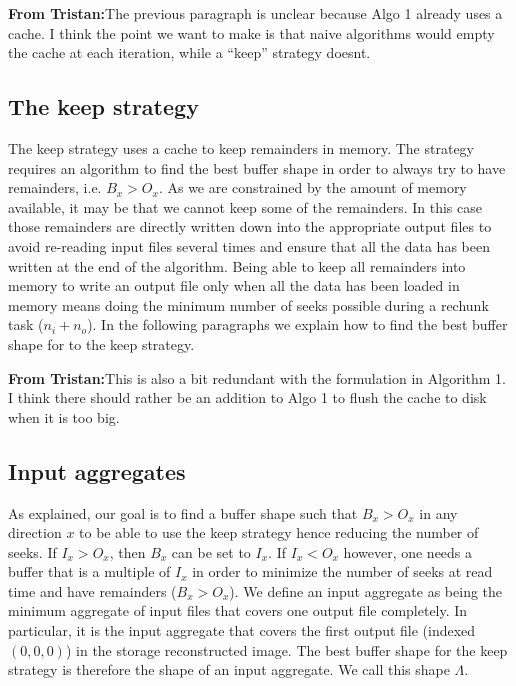 \documentclass[conference]{IEEEtran}
\newcommand{\tristan}[1]{\color{orange}\textbf{From Tristan:}#1\color{black}}
\begin{document}
\tristan{The previous paragraph is unclear because Algo 1 already uses a cache. I think the point we want to make is that
naive algorithms would empty the cache at each iteration, while a ``keep'' strategy doesnt.}

\subsection{The keep strategy}
The keep strategy uses a cache to keep remainders in memory.
The strategy requires an algorithm to find the best buffer shape in order to
always try to have remainders, i.e. $B_x>O_x$. As we are constrained by the
amount of memory available, it may be that we cannot keep some of the remainders.
In this case those remainders are directly written down into the appropriate
output files to avoid re-reading input files several times and ensure that all
the data has been written at the end of the algorithm. Being able to keep all
remainders into memory to write an output file only when all the data has been
loaded in memory means doing the minimum number of seeks possible during a
rechunk task ($n_i + n_o$). In the following paragraphs we explain how to find
the best buffer shape for to the keep strategy.

\tristan{This is also a bit redundant with the formulation in Algorithm 1.
I think there should rather be an addition to Algo 1 to flush the cache to disk when it is too big.}

\subsection{Input aggregates}
As explained, our goal is to find a buffer shape such that $B_x>O_x$ in any
direction $x$ to be able to use the keep strategy hence reducing the number of
seeks. If $I_x > O_x$, then $B_x$ can be set to $I_x$. If $I_x < O_x$ however,
one needs a buffer that is a multiple of $I_x$ in order to minimize the number
of seeks at read time and have remainders ($B_x>O_x$). We define an input
aggregate as being the minimum aggregate of input files that covers one output
file completely. In particular, it is the input aggregate that covers the first
output file (indexed $(0,0,0)$) in the storage reconstructed image. The best
buffer shape for the keep strategy is therefore the shape of an input aggregate.
We call this shape $\Lambda$.
\end{document}

